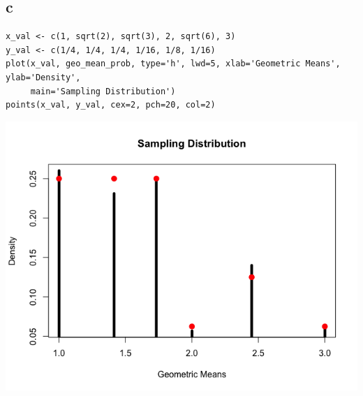 \documentclass[11pt,letterpaper]{article}
\begin{document}
\subsection*{c}
\begin{verbatim}
x_val <- c(1, sqrt(2), sqrt(3), 2, sqrt(6), 3)
y_val <- c(1/4, 1/4, 1/4, 1/16, 1/8, 1/16)
plot(x_val, geo_mean_prob, type='h', lwd=5, xlab='Geometric Means', ylab='Density',
     main='Sampling Distribution')
points(x_val, y_val, cex=2, pch=20, col=2)

\end{verbatim}
\includegraphics[scale=0.5]{lec-2-3-c.png}
\end{document}

